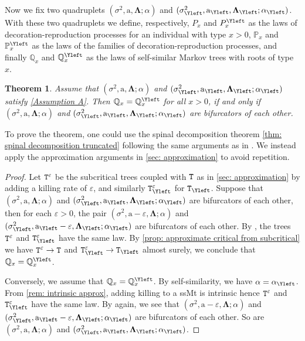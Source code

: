 \documentclass[12pt]{article}
\numberwithin{equation}{section}
\theoremstyle{plain}
\newtheorem{thm}{Theorem}[section]
\theoremstyle{definition}
\newcommand{\Bd}[1]{\boldsymbol{#1}}
\begin{document}
Now we fix two quadruplets $(\sigma^2, \mathrm{a}, \Bd\Lambda; \alpha)$ and $(\sigma^2_{\Yleft}, \mathrm{a}_{\Yleft}, \Bd\Lambda_{\Yleft}; \alpha_{\Yleft})$. With these two quadruplets we define, respectively, $P_x$ and $P^{\Yleft}_x$ as the laws of decoration-reproduction processes for an individual with type $x>0$, $\mathbb{P}_x$ and $\mathbb{P}^{\Yleft}_x$ as the laws of the families of decoration-reproduction processes, and finally $\mathbb{Q}_x$ and $\mathbb{Q}^{\Yleft}_x$ as the laws of self-similar Markov trees with roots of type $x$.

\begin{thm}\label{thm: bifurcators}
Assume that $(\sigma^2, \mathrm{a}, \Bd\Lambda; \alpha)$ and $(\sigma^2_{\Yleft}, \mathrm{a}_{\Yleft}, \Bd\Lambda_{\Yleft}; \alpha_{\Yleft})$ satisfy \cref{Assumption A}. Then $\mathbb{Q}_x = \mathbb{Q}^{\Yleft}_x$ for all $x>0$, if and only if $(\sigma^2, \mathrm{a}, \Bd\Lambda; \alpha)$ and $(\sigma^2_{\Yleft}, \mathrm{a}_{\Yleft}, \Bd\Lambda_{\Yleft}; \alpha_{\Yleft})$ are bifurcators of each other.
\end{thm}

To prove the theorem, one could use the spinal decomposition theorem \cref{thm: spinal decomposition truncated} following the same arguments as in \cite[Section 5.3]{BertoinJean2024SMta}. We instead apply the approximation arguments in \cref{sec: approximation} to avoid repetition.

\begin{proof}
Let ${\tt T}^{\varepsilon}$ be the subcritical trees coupled with ${\tt T}$ as in \cref{sec: approximation} by adding a killing rate of $ \varepsilon$, and similarly ${\tt T}^{\varepsilon}_{\Yleft}$ for  ${\tt T}_{\Yleft}$. Suppose that $(\sigma^2, \mathrm{a}, \Bd\Lambda; \alpha)$ and $(\sigma^2_{\Yleft}, \mathrm{a}_{\Yleft}, \Bd\Lambda_{\Yleft}; \alpha_{\Yleft})$ are bifurcators of each other, then for each $\varepsilon > 0$, the pair $(\sigma^2, \mathrm{a}-\varepsilon, \Bd\Lambda; \alpha)$ and $(\sigma^2_{\Yleft}, \mathrm{a}_{\Yleft}-\varepsilon, \Bd\Lambda_{\Yleft}; \alpha_{\Yleft})$ are bifurcators of each other. By \cite[Theorem 5.13]{BertoinJean2024SMta}, the trees ${\tt T}^{ \varepsilon}$ and ${\tt T}^{\varepsilon}_{\Yleft}$ have the same law. By \cref{prop: approximate critical from subcritical} we have ${\tt T}^{\varepsilon}\to {\tt T}$ and ${\tt T}^{ \varepsilon}_{\Yleft} \to{\tt T}_{\Yleft}$ almost surely, we conclude that $\mathbb{Q}_x = \mathbb{Q}^{\Yleft}_x$.

Conversely, we assume that $\mathbb{Q}_x = \mathbb{Q}^{\Yleft}_x$. By self-similarity, we have $\alpha = \alpha_{\Yleft}$. From \cref{rem: intrinsic approx}, adding killing to a ssMt is intrinsic hence ${\tt T}^{ \varepsilon}$ and ${\tt T}^{ \varepsilon}_{\Yleft}$ have the same law. By \cite[Theorem 5.13]{BertoinJean2024SMta} again, we see that $(\sigma^2, \mathrm{a}-\varepsilon, \Bd\Lambda; \alpha)$ and $(\sigma^2_{\Yleft}, \mathrm{a}_{\Yleft}-\varepsilon, \Bd\Lambda_{\Yleft}; \alpha_{\Yleft})$ are bifurcators of each other. So are $(\sigma^2, \mathrm{a}, \Bd\Lambda; \alpha)$ and $(\sigma^2_{\Yleft}, \mathrm{a}_{\Yleft}, \Bd\Lambda_{\Yleft}; \alpha_{\Yleft})$. \end{proof}
\end{document}
